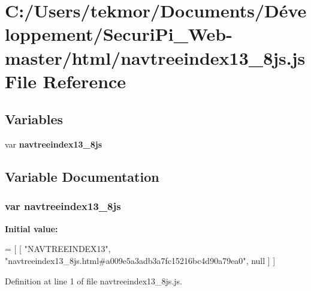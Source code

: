 \section{C\+:/\+Users/tekmor/\+Documents/\+Développement/\+Securi\+Pi\+\_\+\+Web-\/master/html/navtreeindex13\+\_\+8js.js File Reference}
\label{navtreeindex13__8js_8js}
\subsection*{Variables}
\begin{DoxyCompactItemize}
\item 
var {\bf navtreeindex13\+\_\+8js}
\end{DoxyCompactItemize}


\subsection{Variable Documentation}
\subsubsection[{navtreeindex13\+\_\+8js}]{\setlength{\rightskip}{0pt plus 5cm}var navtreeindex13\+\_\+8js}\label{navtreeindex13__8js_8js_a56ec5348f782f9100dbc4cf46afc84d2}
{\bfseries Initial value\+:}
\begin{DoxyCode}
=
[
    [ \textcolor{stringliteral}{"NAVTREEINDEX13"}, \textcolor{stringliteral}{"navtreeindex13\_8js.html#a009e5a3adb3a7fc15216bc4d90a79ea0"}, null ]
]
\end{DoxyCode}


Definition at line 1 of file navtreeindex13\+\_\+8js.\+js.

